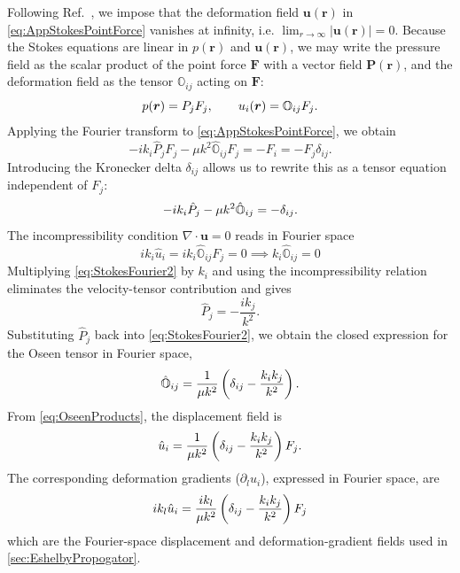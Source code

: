 \documentclass[asymmetricmargins]{library/duthesis}%
\newcommand{\DiffReportBodyFont}{\small}
\newenvironment{DiffReportContent}
  {\begingroup\DiffReportBodyFont}
  {\par\endgroup\medskip}
\begin{document}
\begin{DiffReportContent}
\begin{subappendices}
Following Ref.~\cite{kim_microhydrodynamics_1991}, we impose that the deformation field $\bm{u}(\bm{r})$ in \cref{eq:AppStokesPointForce} vanishes at infinity, i.e. $\lim_{r \to \infty}|\bm{u}(\bm{r})| = 0$. Because the Stokes equations are linear in $p(\bm{r})$ and $\bm{u}(\bm{r})$, we may write the pressure field as the scalar product of the point force $\bm{F}$ with a vector field $\bm{P}(\bm{r})$, and the deformation field as the tensor $\mathbb{O}_{ij}$ acting on $\bm{F}$:
\begin{equation}
    p(\bm{r}) = P_j F_j, \qquad
    u_i(\bm{r}) = \mathbb{O}_{ij} F_j.
    \relax
\end{equation}
Applying the Fourier transform to \cref{eq:AppStokesPointForce}, we obtain
\begin{equation*}
- i k_i \hat{P}_j F_j 
- \mu k^2 \hat{\mathbb{O}}_{ij} F_j 
= -F_i = -F_j \delta_{ij}.
\end{equation*}
Introducing the Kronecker delta $\delta_{ij}$ allows us to rewrite this as a tensor equation independent of $F_j$:
\begin{equation}
    - i k_i \hat{P}_j 
    - \mu k^2 \hat{\mathbb{O}}_{ij} 
    = -\delta_{ij}.
    \relax
\end{equation}
The incompressibility condition $\nabla \cdot \bm{u} = 0$ reads in Fourier space
\[
    ik_i\hat{u}_i=ik_i\hat{\mathbb{O}}_{ij} F_j=0 \implies k_i\hat{\mathbb{O}}_{ij} = 0
\]
Multiplying \cref{eq:StokesFourier2} by $k_i$ and using the incompressibility relation eliminates the velocity-tensor contribution and gives
\begin{equation*}
    \hat{P}_j = -\frac{ik_j}{k^2}.
\end{equation*}
Substituting $\hat{P}_j$ back into \cref{eq:StokesFourier2}, we obtain the closed expression for the Oseen tensor in Fourier space,
\begin{equation}
    \hat{\mathbb{O}}_{ij} = \frac{1}{\mu k^2}\left( \delta_{ij} - \frac{k_ik_j}{k^2} \right).
    \relax
\end{equation}
From \cref{eq:OseenProducts}, the displacement field is
\begin{equation}
    \hat{u}_i = \frac{1}{\mu k^2}\left( \delta_{ij} - \frac{k_ik_j}{k^2} \right)F_j.
    \relax
\end{equation}
The corresponding deformation gradients ($\partial_l u_i$), expressed in Fourier space, are
\begin{equation}
    ik_l\hat{u}_i = \frac{ik_l}{\mu k^2}\left( \delta_{ij} - \frac{k_ik_j}{k^2} \right)F_j
    \relax
\end{equation}
which are the Fourier-space displacement and deformation-gradient fields used in \cref{sec:EshelbyPropogator}.


\end{subappendices}
\end{DiffReportContent}
\end{document}
